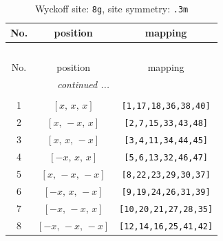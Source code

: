 \documentclass[fleqn,8pt]{jsarticle}
\begin{document}
\renewcommand{\arraystretch}{1.2}
\begin{longtable}{ccc}
\caption{Wyckoff site: {\tt 8g}, site symmetry: {\tt .3m}}
 \\
 \hline \hline
No. & position & mapping \\ \hline \endfirsthead

\multicolumn{2}{l}{\tablename\ \thetable{}} \\
 \hline \hline
No. & position & mapping \\ \hline \endhead

 \hline \hline
\multicolumn{2}{r}{\footnotesize\it continued ...} \\ \endfoot

 \hline \hline
\multicolumn{2}{r}{} \\ \endlastfoot

1 & $\left[ x,\, x,\, x \right]$ & {\tt [1,17,18,36,38,40]} \\ \hline
2 & $\left[ x,\, - x,\, x \right]$ & {\tt [2,7,15,33,43,48]} \\ \hline
3 & $\left[ x,\, x,\, - x \right]$ & {\tt [3,4,11,34,44,45]} \\ \hline
4 & $\left[ - x,\, x,\, x \right]$ & {\tt [5,6,13,32,46,47]} \\ \hline
5 & $\left[ x,\, - x,\, - x \right]$ & {\tt [8,22,23,29,30,37]} \\ \hline
6 & $\left[ - x,\, x,\, - x \right]$ & {\tt [9,19,24,26,31,39]} \\ \hline
7 & $\left[ - x,\, - x,\, x \right]$ & {\tt [10,20,21,27,28,35]} \\ \hline
8 & $\left[ - x,\, - x,\, - x \right]$ & {\tt [12,14,16,25,41,42]} \\
\end{longtable}
\renewcommand{\arraystretch}{1.2}
\end{document}
